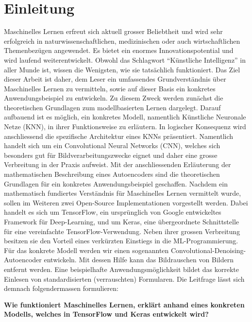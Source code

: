 \chapter*{Einleitung}
Maschinelles Lernen erfreut sich aktuell grosser Beliebtheit und wird
sehr erfolgreich in naturwissenschaftlichen, medizinischen oder auch
wirtschaftlichen Themenbezügen angewendet. Es bietet ein enormes
Innovationspotential und wird laufend weiterentwickelt.
Obwohl das Schlagwort ``Künstliche Intelligenz'' in aller Munde ist, wissen die
Wenigsten, wie sie tatsächlich funktioniert.
\para{}
Das Ziel dieser Arbeit ist daher, dem Leser ein umfassendes Grundverständnis
über Maschinelles Lernen zu vermitteln, sowie auf dieser Basis ein konkretes
Anwendungsbeispiel zu entwickeln. Zu diesem Zweck werden zunächst die
theoretischen Grundlagen zum modellbasierten Lernen dargelegt. Darauf aufbauend
ist es möglich, ein konkretes Modell, namentlich Künstliche Neuronale Netze
(KNN), in
ihrer Funktionsweise zu erläutern. In logischer Konsequenz wird anschliessend
die spezifische Architektur eines KNNs präsentiert. Namentlich handelt sich um
ein Convolutional Neural Networks (CNN), welches sich besonders gut für
Bildverarbeitungszwecke eignet und daher eine grosse Verbreitung in der Praxis aufweist.
Mit der anschliessenden Erläuterung der mathematischen Beschreibung eines Autoencoders sind
die theoretischen Grundlagen für ein konkretes Anwendungsbeispiel geschaffen.
\para{}
Nachdem ein mathematisch fundiertes Verständnis für Maschinelles Lernen
vermittelt wurde, sollen im Weiteren zwei Open-Source Implementationen vorgestellt
werden. Dabei handelt es sich um TensorFlow, ein ursprünglich von Google
entwickeltes Framework für Deep-Learning, und um Keras, eine übergeordnete
Schnittstelle für eine vereinfachte TensorFlow-Verwendung. Neben ihrer grossen
Verbreitung besitzen sie den Vorteil eines verkürzten Einstiegs in die
ML-Programmierung.
\para{}
Für das konkrete Modell werden wir einen sogenannten
Convolutional-Denoising-Autoencoder entwickeln. Mit dessen Hilfe kann das
Bildrauschen von Bildern entfernt werden. Eine beispielhafte
Anwendungsmöglichkeit bildet das korrekte Einlesen von standardisierten (verrauschten) Formularen.
\para{}
Die Leitfrage lässt sich demnach folgendermassen formulieren:
\begin{center}
  \textbf{Wie funktioniert Maschinelles Lernen, erklärt anhand eines konkreten
    Modells, welches in TensorFlow und Keras entwickelt wird?}
\end{center}
\para{}

